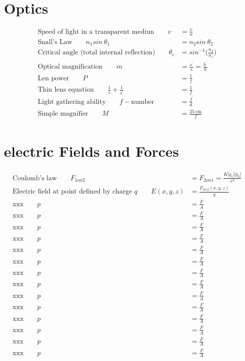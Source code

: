 \documentclass[]{article}
\begin{document}
\newpage



\section{Optics}

\begin{align*}
	\text{Speed of light in a transparent mediun} \qquad v &= \frac{c}{n} \\
	\text{Snall's Law} \qquad n_1 sin \ \theta_1  &= n_2 sin \ \theta_2 \\
	\text{Critical angle (total internal reflection)} \qquad \theta_c &= sin^{-1} \Big( \frac{n_2}{n_1} \Big) \\
	\text{Optical magnification} \qquad m &= \frac{s^{'}}{s} = \frac{h^{'}}{h}\\
	\text{Len power} \qquad P &= \frac{1}{f} \\
	\text{Thin lens equation} \qquad \frac{1}{s} + \frac{1}{s^{'}} &= \frac{1}{f} \\
	\text{Light gathering ability} \qquad f - \text{number} &= \frac{f}{d} \\
	\text{Simple magnifier} \qquad M &= \frac{25 \  \text{cm}}{f} \\
\end{align*}

\newpage



\section{electric Fields and Forces}

\begin{align*}
	\text{Coulomb's law} \qquad F_{1 on 2} &= F_{2 on 1} = \frac{K \left| q_1 \right| \left| q_2 \right| }{r^2} \\
	\text{Electric field at point defined by charge $q$} \qquad E(x,y,z) &= \frac{F_{on\ q}(x,y,z)}{q} \\
	\text{xxx} \qquad p &= \frac{F}{A} \\
	\text{xxx} \qquad p &= \frac{F}{A} \\
	\text{xxx} \qquad p &= \frac{F}{A} \\
	\text{xxx} \qquad p &= \frac{F}{A} \\
	\text{xxx} \qquad p &= \frac{F}{A} \\
	\text{xxx} \qquad p &= \frac{F}{A} \\
	\text{xxx} \qquad p &= \frac{F}{A} \\
	\text{xxx} \qquad p &= \frac{F}{A} \\
	\text{xxx} \qquad p &= \frac{F}{A} \\
	\text{xxx} \qquad p &= \frac{F}{A} \\
	\text{xxx} \qquad p &= \frac{F}{A} \\
	\text{xxx} \qquad p &= \frac{F}{A} \\
	\text{xxx} \qquad p &= \frac{F}{A} \\
	\text{xxx} \qquad p &= \frac{F}{A} \\
\end{align*}
\end{document}
